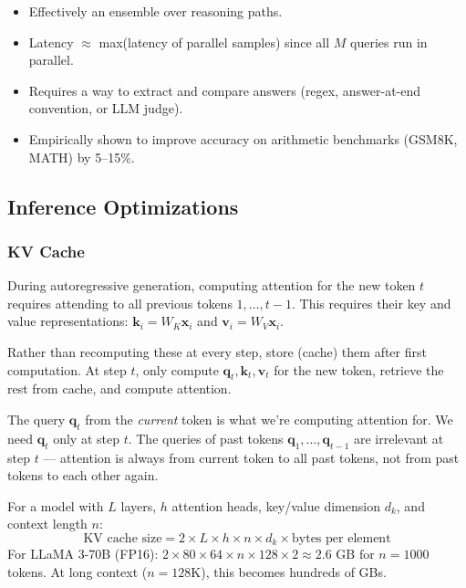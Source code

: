 \documentclass[11pt, a4paper]{article}
\begin{document}
\begin{itemize}[leftmargin=2em]
  \item Effectively an ensemble over reasoning paths.
  \item Latency $\approx$ max(latency of parallel samples) since all $M$ queries run in parallel.
  \item Requires a way to extract and compare answers (regex, answer-at-end convention, or LLM judge).
  \item Empirically shown to improve accuracy on arithmetic benchmarks (GSM8K, MATH) by 5--15\%.
\end{itemize}

\subsection{Inference Optimizations}

\subsubsection{KV Cache}

\begin{defbox}[KV Caching]
During autoregressive generation, computing attention for the new token $t$ requires attending to all previous tokens $1, \ldots, t-1$. This requires their key and value representations: $\mathbf{k}_i = W_K \mathbf{x}_i$ and $\mathbf{v}_i = W_V \mathbf{x}_i$.

Rather than recomputing these at every step, store (cache) them after first computation. At step $t$, only compute $\mathbf{q}_t, \mathbf{k}_t, \mathbf{v}_t$ for the new token, retrieve the rest from cache, and compute attention.
\end{defbox}

\begin{notebox}
The query $\mathbf{q}_t$ from the \emph{current} token is what we're computing attention for. We need $\mathbf{q}_t$ only at step $t$. The queries of past tokens $\mathbf{q}_1, \ldots, \mathbf{q}_{t-1}$ are irrelevant at step $t$ --- attention is always from current token to all past tokens, not from past tokens to each other again.
\end{notebox}

\begin{notebox}
For a model with $L$ layers, $h$ attention heads, key/value dimension $d_k$, and context length $n$:
\[
\text{KV cache size} = 2 \times L \times h \times n \times d_k \times \text{bytes per element}
\]
For LLaMA 3-70B (FP16): $2 \times 80 \times 64 \times n \times 128 \times 2 \approx 2.6\text{ GB for } n=1000$ tokens. At long context ($n=128\text{K}$), this becomes hundreds of GBs.
\end{notebox}
\end{document}
